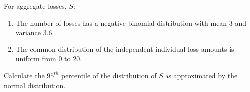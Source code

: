 For aggregate losses, $S$:
\begin{enumerate}
\item The number of losses has a negative binomial distribution with mean 3 and
variance 3.6.
\item The common distribution of the independent individual loss amounts is uniform from
0 to 20.
\end{enumerate}
Calculate the $95^{th}$ percentile of the distribution of $S$ as approximated by the normal
distribution.

  
 
